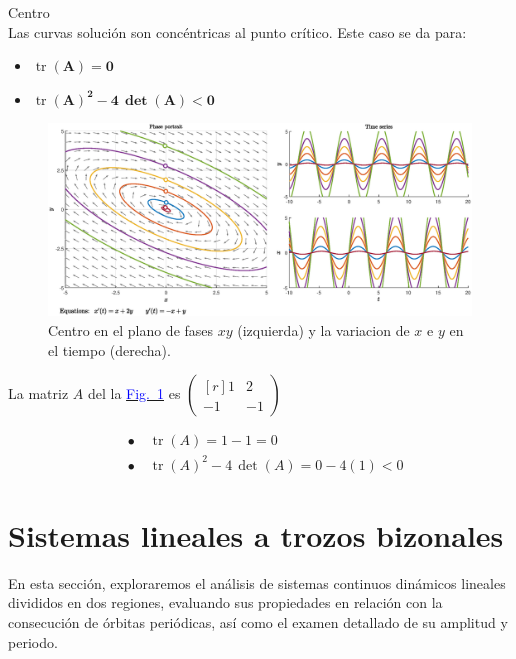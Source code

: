 \documentclass[12pt,a4paper]{report} %
\newcommand{\fref}[1]{\hyperref[#1]{\textcolor{blue}{Fig.~\ref*{#1}}}}
\newcommand{\fref}[1]{\hyperref[#1]{\textcolor{blue}{\textit{Fig.~\ref*{#1}}}}}
\newcommand{\tr}{\operatorname{\textrm{tr}}}
\begin{document}
	\newpage
	
    {\Large\textbullet\quad Centro}\\[0.5cm]
    
    Las curvas solución son concéntricas al punto crítico. Este caso se da para: 
    \begin{itemize}
    	\item \textbf{$\tr$}$\bm{(A)=0}$
    	\item \textbf{$\tr$}$\bm{(A)^2-4\, \det(A)<0}$
    \end{itemize}
    
    \begin{figure}[h]
    	\centering
    	\includegraphics[width=1\textwidth]{centro.eps}
    	\caption{Centro en el plano de fases $xy$ (izquierda) y la variacion de $x$ e $y$ en el tiempo (derecha).}
    	\label{fig:centro}
    \end{figure}\smallskip
    
    La matriz $A$ del la \fref{fig:centro} es 
    $\begin{pmatrix*}[r]
    	1 & 2 \\
    	-1 & -1
    \end{pmatrix*}$
    
    \begin{align*}
    	&\bullet\quad \tr(A)=1-1=0 \\[2mm]
    	&\bullet\quad \tr(A)^2-4\, \det(A)=0-4(1)<0
    \end{align*}
	
	\newpage
	\section{Sistemas lineales a trozos bizonales}
	\label{sistrobiz}
	En esta sección, exploraremos el análisis de sistemas continuos dinámicos lineales divididos en dos regiones, evaluando sus propiedades en relación con la consecución de órbitas periódicas, así como el examen detallado de su amplitud y periodo.
	
\end{document}
